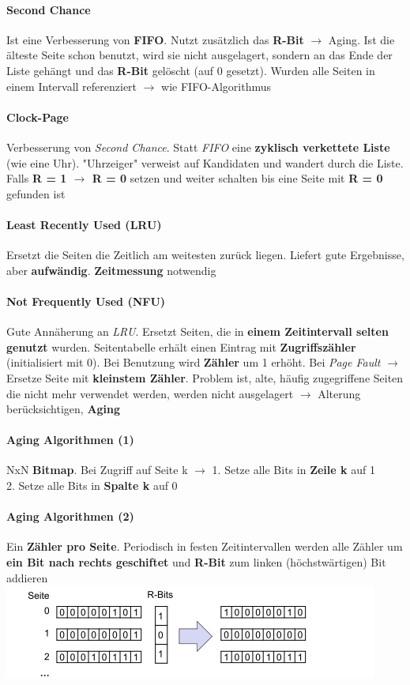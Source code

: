\documentclass[11pt,a4paper,landscape]{article}
\begin{document}
\begin{multicols*}{3}
	\paragraph{Second Chance} Ist eine Verbesserung von \textbf{FIFO}. Nutzt zusätzlich das \textbf{R-Bit} $\rightarrow$ Aging. Ist die älteste Seite schon benutzt, wird sie nicht ausgelagert, sondern an das Ende der Liste gehängt und das \textbf{R-Bit} gelöscht (auf 0 gesetzt). Wurden alle Seiten in einem Intervall referenziert $\rightarrow$ wie FIFO-Algorithmus
	\paragraph{Clock-Page} Verbesserung von \textit{Second Chance}. Statt \textit{FIFO} eine \textbf{zyklisch verkettete Liste} (wie eine Uhr). "Uhrzeiger" verweist auf Kandidaten und wandert durch die Liste. Falls \textbf{R = 1 $\rightarrow$ R = 0} setzen und weiter schalten bis eine Seite mit \textbf{R = 0} gefunden ist
	\paragraph{Least Recently Used (LRU)} Ersetzt die Seiten die Zeitlich am weitesten zurück liegen. Liefert gute Ergebnisse, aber \textbf{aufwändig}. \textbf{Zeitmessung} notwendig
	\paragraph{Not Frequently Used (NFU)} Gute Annäherung an \textit{LRU}. Ersetzt Seiten, die in \textbf{einem Zeitintervall selten genutzt} wurden. Seitentabelle erhält einen Eintrag mit \textbf{Zugriffszähler} (initialisiert mit 0). Bei Benutzung wird \textbf{Zähler} um 1 erhöht. Bei \textit{Page Fault} $\rightarrow$ Ersetze Seite mit \textbf{kleinstem Zähler}. Problem ist, alte, häufig zugegriffene Seiten die nicht mehr verwendet werden, werden nicht ausgelagert $\rightarrow$ Alterung berücksichtigen, \textbf{Aging}
	\paragraph{Aging Algorithmen (1)} NxN \textbf{Bitmap}. Bei Zugriff auf Seite k $\rightarrow$ 1. Setze alle Bits in \textbf{Zeile k} auf 1\\ 2. Setze alle Bits in \textbf{Spalte k} auf 0
	\paragraph{Aging Algorithmen (2)} Ein \textbf{Zähler pro Seite}. Periodisch in festen Zeitintervallen werden alle Zähler um \textbf{ein Bit nach rechts geschiftet} und \textbf{R-Bit} zum linken (höchstwärtigen) Bit addieren\\
	\includegraphics[width=1.05\columnwidth]{aging}

\end{multicols*}
\end{document}
